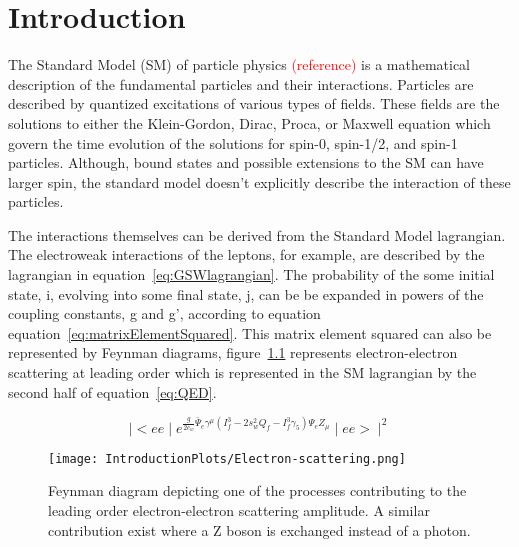 \chapter{Introduction}
\label{sec:intro}

The Standard Model (SM) of particle physics \textcolor{red}{(reference)} 
is a mathematical description of the fundamental particles and their 
interactions.  Particles are described by quantized excitations of 
various types of fields.  These fields are the solutions to either the
Klein-Gordon, Dirac, Proca, or Maxwell equation which govern the time
evolution of the solutions for spin-0, spin-1/2, and spin-1 particles.
Although, bound states and possible extensions to the SM can have
larger spin, the standard model doesn't explicitly describe the interaction
of these particles.

The interactions themselves can be derived from the Standard Model lagrangian.
The electroweak interactions of the leptons, for example, are described by
the lagrangian in equation~\ref{eq:GSWlagrangian}.  The probability of the
some initial state, i, evolving into some final state, j, can be 
be expanded in powers of the coupling constants, g and g', according to 
equation equation~\ref{eq:matrixElementSquared}.  This matrix element
squared can also be represented by Feynman diagrams, 
figure~\ref{fyn:eeScattering} 
represents electron-electron scattering at leading order which is 
represented in the SM lagrangian by the second half of 
equation~\ref{eq:QED}.

\begin{center}
\begin{equation}
\mid<ee\mid e^{\frac{g}{2c_w}\bar{\Psi}_e\gamma^{\mu}(I_f^3-2s_w^2Q_f-I_f^3\gamma_5)\Psi_eZ_{\mu}}\mid ee>\mid^2
\label{eq:matrixElementSquared}
\end{equation}
\end{center}

\begin{figure}
\begin{center}
\texttt{[image: IntroductionPlots/Electron-scattering.png]}
\label{fyn:eeScattering}
\caption{Feynman diagram depicting one of the processes contributing to the leading order
electron-electron scattering amplitude. A similar contribution exist where a Z boson is
exchanged instead of a photon.}
\end{center}
\end{figure}

